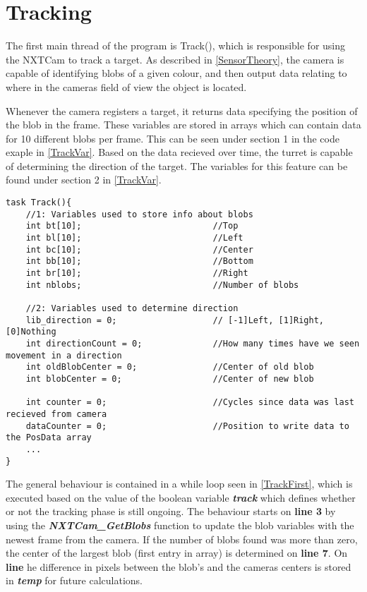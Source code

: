 \section{Tracking}
The first main thread of the program is Track(), which is responsible for using
the NXTCam to track a target. As described in \autoref{SensorTheory}, the camera
is capable of identifying blobs of a given colour, and then output data relating to where
in the cameras field of view the object is located.\nl

Whenever the camera registers a target, it returns data specifying the position
of the blob in the frame. These variables are stored in arrays which can
contain data for 10 different blobs per frame. This can be seen under section 1
in the code exaple in \autoref{TrackVar}. Based on the data recieved over time,
the turret is capable of determining the direction of the target. The variables
for this feature can be found under section 2 in \autoref{TrackVar}.
 
\begin{minipage}[H]{\linewidth}
\begin{lstlisting}[caption = Variables used on the Track() thread., label = TrackVar, style = nc] 
task Track(){
    //1: Variables used to store info about blobs
    int bt[10];                          //Top
    int bl[10];                          //Left
    int bc[10];                          //Center
    int bb[10];                          //Bottom
    int br[10];                          //Right
    int nblobs;                          //Number of blobs

    //2: Variables used to determine direction
    lib_direction = 0;                   // [-1]Left, [1]Right, [0]Nothing
    int directionCount = 0;              //How many times have we seen movement in a direction
    int oldBlobCenter = 0;               //Center of old blob
    int blobCenter = 0;                  //Center of new blob

    int counter = 0;                     //Cycles since data was last recieved from camera
    dataCounter = 0;                     //Position to write data to the PosData array
    ...
}
\end{lstlisting}
\end{minipage}

The general behaviour is contained in a while loop seen in \autoref{TrackFirst},
which is executed based on the value of the boolean variable
\textbf{\textit{track}} which defines whether or not the tracking phase is still
ongoing. The behaviour starts on \textbf{line 3} by using the
\textbf{\textit{NXTCam\_GetBlobs}} function to update the blob variables with
the newest frame from the camera. If the number of blobs found was more than
zero, the center of the largest blob (first entry in array) is determined on
\textbf{line 7}. On \textbf{line } he difference in pixels between the blob's
and the cameras centers is stored in \textbf{\textit{temp}} for future
calculations.\nl
  

